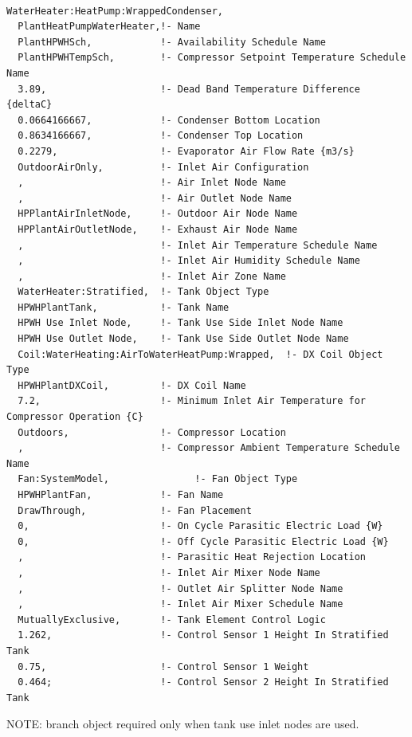 \begin{lstlisting}

WaterHeater:HeatPump:WrappedCondenser,
  PlantHeatPumpWaterHeater,!- Name
  PlantHPWHSch,            !- Availability Schedule Name
  PlantHPWHTempSch,        !- Compressor Setpoint Temperature Schedule Name
  3.89,                    !- Dead Band Temperature Difference {deltaC}
  0.0664166667,            !- Condenser Bottom Location
  0.8634166667,            !- Condenser Top Location
  0.2279,                  !- Evaporator Air Flow Rate {m3/s}
  OutdoorAirOnly,          !- Inlet Air Configuration
  ,                        !- Air Inlet Node Name
  ,                        !- Air Outlet Node Name
  HPPlantAirInletNode,     !- Outdoor Air Node Name
  HPPlantAirOutletNode,    !- Exhaust Air Node Name
  ,                        !- Inlet Air Temperature Schedule Name
  ,                        !- Inlet Air Humidity Schedule Name
  ,                        !- Inlet Air Zone Name
  WaterHeater:Stratified,  !- Tank Object Type
  HPWHPlantTank,           !- Tank Name
  HPWH Use Inlet Node,     !- Tank Use Side Inlet Node Name
  HPWH Use Outlet Node,    !- Tank Use Side Outlet Node Name
  Coil:WaterHeating:AirToWaterHeatPump:Wrapped,  !- DX Coil Object Type
  HPWHPlantDXCoil,         !- DX Coil Name
  7.2,                     !- Minimum Inlet Air Temperature for Compressor Operation {C}
  Outdoors,                !- Compressor Location
  ,                        !- Compressor Ambient Temperature Schedule Name
  Fan:SystemModel,               !- Fan Object Type
  HPWHPlantFan,            !- Fan Name
  DrawThrough,             !- Fan Placement
  0,                       !- On Cycle Parasitic Electric Load {W}
  0,                       !- Off Cycle Parasitic Electric Load {W}
  ,                        !- Parasitic Heat Rejection Location
  ,                        !- Inlet Air Mixer Node Name
  ,                        !- Outlet Air Splitter Node Name
  ,                        !- Inlet Air Mixer Schedule Name
  MutuallyExclusive,       !- Tank Element Control Logic
  1.262,                   !- Control Sensor 1 Height In Stratified Tank
  0.75,                    !- Control Sensor 1 Weight
  0.464;                   !- Control Sensor 2 Height In Stratified Tank
\end{lstlisting}

NOTE: branch object required only when tank use inlet nodes are used.

